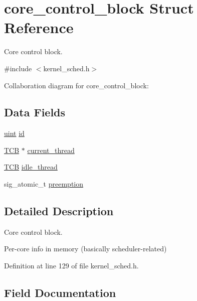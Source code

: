 \hypertarget{structcore__control__block}{}\section{core\+\_\+control\+\_\+block Struct Reference}
\label{structcore__control__block}


Core control block.  




{\ttfamily \#include $<$kernel\+\_\+sched.\+h$>$}



Collaboration diagram for core\+\_\+control\+\_\+block\+:
\subsection*{Data Fields}
\begin{DoxyCompactItemize}
\item 
\hyperlink{bios_8h_a91ad9478d81a7aaf2593e8d9c3d06a14}{uint} \hyperlink{structcore__control__block_a5208867f309bdd1656fd473f38b30bfe}{id}
\item 
\hyperlink{group__scheduler_gaf88d9c946bf70b36a1e8bc34383abfc9}{T\+CB} $\ast$ \hyperlink{structcore__control__block_aac649db5b9a99e693ed21c7e610834bf}{current\+\_\+thread}
\item 
\hyperlink{group__scheduler_gaf88d9c946bf70b36a1e8bc34383abfc9}{T\+CB} \hyperlink{structcore__control__block_a6dd29dab4a95ce740f45370345408c52}{idle\+\_\+thread}
\item 
sig\+\_\+atomic\+\_\+t \hyperlink{structcore__control__block_a858cde45d4478d73f60e839594b363f4}{preemption}
\end{DoxyCompactItemize}


\subsection{Detailed Description}
Core control block. 

Per-\/core info in memory (basically scheduler-\/related) 

Definition at line 129 of file kernel\+\_\+sched.\+h.



\subsection{Field Documentation}
